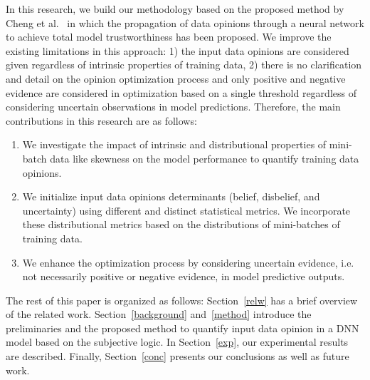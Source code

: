 {\color{blue}In this research, we build our methodology based on the proposed method by Cheng et al.~\cite{hope} in which the propagation of data opinions through a neural network to achieve total model trustworthiness has been proposed. We improve the existing limitations in this approach: 1) the input data opinions are considered given regardless of intrinsic properties of training data, 2) there is no clarification and detail on the opinion optimization process and only positive and negative evidence are considered in optimization based on a single threshold regardless of considering uncertain observations in model predictions. Therefore, the main contributions in this research are as follows:
\begin{enumerate}
    \item We investigate the impact of intrinsic and distributional properties of mini-batch data like skewness on the model performance to quantify training data opinions. 
    \item We initialize input data opinions determinants (belief, disbelief, and uncertainty) using different and distinct statistical metrics. We incorporate these distributional metrics based on the distributions of mini-batches of training data.
    \item We enhance the optimization process by considering uncertain evidence, i.e. not necessarily positive or negative evidence, in model predictive outputs.
\end{enumerate}
}
{\color{red}The rest of this paper is organized as follows: Section~\ref{relw} has a brief overview of the related work. Section~\ref{background} and~\ref{method} introduce the preliminaries and the proposed method to quantify input data opinion in a DNN model based on the subjective logic. In Section~\ref{exp}, our experimental results are described. Finally, Section~\ref{conc} presents our conclusions as well as future work.}


